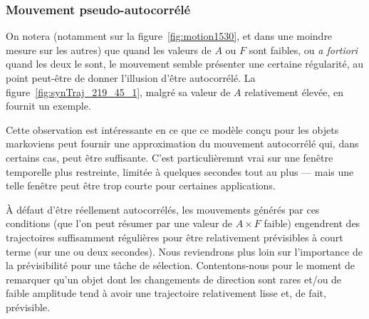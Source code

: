 	\subsubsection{Mouvement pseudo-autocorrélé}
	On notera (notamment sur la figure~\ref{fig:motion1530}, et dans une moindre mesure sur les autres) que quand les valeurs de $A$ ou $F$ sont faibles, ou \emph{a fortiori} quand les deux le sont, le mouvement semble présenter une certaine régularité, au point peut-être de donner l'illusion d'être autocorrélé. La figure~\ref{fig:synTraj_219_45_1}, malgré sa valeur de $A$ relativement élevée, en fournit un exemple.
	
	Cette observation est intéressante en ce que ce modèle conçu pour les objets markoviens peut fournir une approximation du mouvement autocorrélé qui, dans certains cas, peut être suffisante. C'est particulièremnt vrai sur une fenêtre temporelle plus restreinte, limitée à quelques secondes tout au plus --- mais une telle fenêtre peut être trop courte pour certaines applications.
	
	À défaut d'être réellement autocorrélés, les mouvements générés par ces conditions (que l'on peut résumer par une valeur de $A \times F$ faible) engendrent des trajectoires suffisamment \og régulières \fg{} pour être relativement prévisibles à court terme (sur une ou deux secondes). Nous reviendrons plus loin sur l'importance de la prévisibilité pour une tâche de sélection. Contentons-nous pour le moment de remarquer qu'un objet dont les changements de direction sont rares et/ou de faible amplitude tend à avoir une trajectoire relativement \og lisse \fg{} et, de fait, prévisible.


